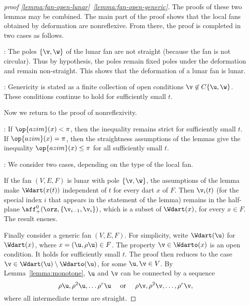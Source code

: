 \begin{proof}[proof \eqref{lemma:fan-open-lunar}~\eqref{lemma:fan-open-generic}] 
  The proofs of these two lemmas may be combined.  The main part of
  the proof shows that the local fans obtained by deformation are
  nonreflexive.  From there, the proof is completed in two cases as
  follows.

  : The poles $\{\v,\w\}$ of the lunar fan are not straight
  (because the fan is not circular). Thus by hypothesis, the poles
  remain fixed poles under the deformation and remain non-straight.  This
  shows that the deformation of a lunar fan is lunar.

  : Genericity is stated as a finite collection of
open conditions $\v\not\in
  C\{\u,\w\}$.  These conditions continue to hold for sufficiently
  small $t$.

Now we return to the proof of nonreflexivity.

: If $\op{azim}(x)<\pi$, then the inequality remains
strict for sufficiently small $t$.  If $\op{azim}(x)=\pi$, then the
straightness assumptions of the lemmas give the inequality 
$\op{azim}(x)\le\pi$ for all sufficiently small $t$.

: We consider two cases, depending on the type of
the local fan.


If the fan $(V,E,F)$ is lunar with pole $\{\v,\w\}$, the assumptions
of the lemma make $\Wdart(x(t))$ independent of $t$ for every dart $x$
of $F$.  Then $\v_i(t)$ (for the special index $i$ that appears in the
statement of the lemma) remains in the half-plane
$\aff_+^0(\orz,\{\v_{i-1},\v_i\})$, which is a subset of $\Wdart(x)$,
for every $x\in F$.  The result ensues.

Finally consider a generic fan $(V,E,F)$.  For simplicity, write
$\Wdart(\u)$ for $\Wdart(x)$, where $x=(\u,\rho\u)\in F$.  The
property $\v\in \Wdarto(x)$ is an open condition.  It holds for
sufficiently small $t$.  The proof then reduces to the case
$\v\in \Wdart(\u)\setminus \Wdarto(\u)$, for some $\u,\v\in V$.  By
Lemma~\ref{lemma:monotone}, $\u$ and $\v$ can be connected by a
sequence
\[
\rho\u, \rho^2\u,\ldots \rho^r\u\quad\text{ or }\quad 
\rho\v, \rho^2\v,\ldots,\rho^r\v,
\]
where all intermediate terms are straight.


\end{proof}
